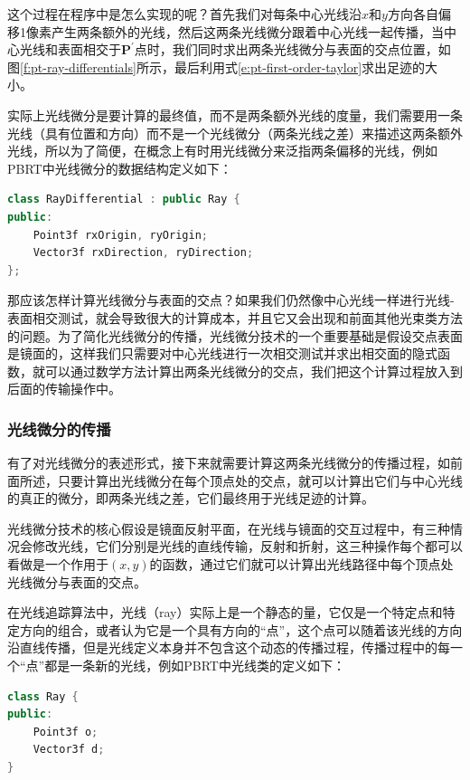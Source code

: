 这个过程在程序中是怎么实现的呢？首先我们对每条中心光线沿$x$和$y$方向各自偏移1像素产生两条额外的光线，然后这两条光线微分跟着中心光线一起传播，当中心光线和表面相交于$\mathbf{P}^{'}$点时，我们同时求出两条光线微分与表面的交点位置，如图\ref{f:pt-ray-differentials}所示，最后利用式\ref{e:pt-first-order-taylor}求出足迹的大小。

实际上光线微分是要计算的最终值，而不是两条额外光线的度量，我们需要用一条光线（具有位置和方向）而不是一个光线微分（两条光线之差）来描述这两条额外光线，所以为了简便，在概念上有时用光线微分来泛指两条偏移的光线，例如PBRT\cite{b:pbrt}中光线微分的数据结构定义如下：

\begin{lstlisting}[language=C++]
class RayDifferential : public Ray { 
public:
	Point3f rxOrigin, ryOrigin;
	Vector3f rxDirection, ryDirection;
};
\end{lstlisting}

那应该怎样计算光线微分与表面的交点？如果我们仍然像中心光线一样进行光线-表面相交测试，就会导致很大的计算成本，并且它又会出现和前面其他光束类方法的问题。为了简化光线微分的传播，光线微分技术的一个重要基础是假设交点表面是镜面的，这样我们只需要对中心光线进行一次相交测试并求出相交面的隐式函数，就可以通过数学方法计算出两条光线微分的交点，我们把这个计算过程放入到后面的传输操作中。






\subsubsection{光线微分的传播}
有了对光线微分的表述形式，接下来就需要计算这两条光线微分的传播过程，如前面所述，只要计算出光线微分在每个顶点处的交点，就可以计算出它们与中心光线的真正的微分，即两条光线之差，它们最终用于光线足迹的计算。

光线微分技术的核心假设是镜面反射平面，在光线与镜面的交互过程中，有三种情况会修改光线，它们分别是光线的直线传输，反射和折射，这三种操作每个都可以看做是一个作用于$(x,y)$的函数，通过它们就可以计算出光线路径中每个顶点处光线微分与表面的交点。

在光线追踪算法中，光线（ray）实际上是一个静态的量，它仅是一个特定点和特定方向的组合，或者认为它是一个具有方向的“点”，这个点可以随着该光线的方向沿直线传播，但是光线定义本身并不包含这个动态的传播过程，传播过程中的每一个“点”都是一条新的光线，例如PBRT中光线类的定义如下：

\begin{lstlisting}[language=C++]
class Ray {
public:
    Point3f o;
    Vector3f d;
}
\end{lstlisting}

